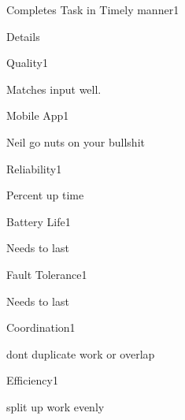 \begin{nonfunctional_requirement}{Completes Task in Timely manner}{1}
\item Details
\end{nonfunctional_requirement}

\begin{nonfunctional_requirement}{Quality}{1}
\item Matches input well. 
\end{nonfunctional_requirement}

\begin{nonfunctional_requirement}{Mobile App}{1}
\item Neil go nuts on your bullshit
\end{nonfunctional_requirement}

\begin{nonfunctional_requirement}{Reliability}{1}
\item Percent up time
\end{nonfunctional_requirement}

\begin{nonfunctional_requirement}{Battery Life}{1}
\item Needs to last
\end{nonfunctional_requirement}

\begin{nonfunctional_requirement}{Fault Tolerance}{1}
\item Needs to last
\end{nonfunctional_requirement}

\begin{nonfunctional_requirement}{Coordination}{1}
\item dont duplicate work or overlap
\end{nonfunctional_requirement}

\begin{nonfunctional_requirement}{Efficiency}{1}
\item split up work evenly
\end{nonfunctional_requirement}
